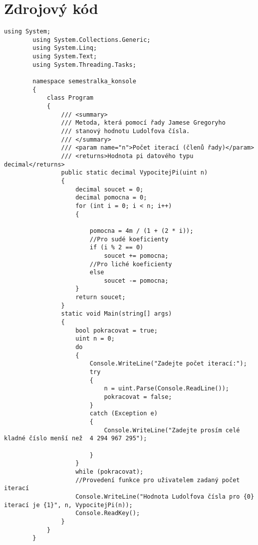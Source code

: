 \documentclass[11pt,a4paper,twoside,openright]{report}
\begin{document}
	\section{Zdrojový kód}
        \begin{lstlisting}[caption=Výsledný zdrojový kód]
        using System;
        using System.Collections.Generic;
        using System.Linq;
        using System.Text;
        using System.Threading.Tasks;
        
        namespace semestralka_konsole
        {
            class Program
            {
                /// <summary>
                /// Metoda, která pomocí řady Jamese Gregoryho
                /// stanový hodnotu Ludolfova čísla.
                /// </summary>
                /// <param name="n">Počet iterací (členů řady)</param>
                /// <returns>Hodnota pi datového typu decimal</returns>
                public static decimal VypocitejPi(uint n)
                {
                    decimal soucet = 0;
                    decimal pomocna = 0;
                    for (int i = 0; i < n; i++)
                    {
        
                        pomocna = 4m / (1 + (2 * i));
                        //Pro sudé koeficienty
                        if (i % 2 == 0)
                            soucet += pomocna;
                        //Pro liché koeficienty
                        else
                            soucet -= pomocna;
                    }
                    return soucet;
                }
                static void Main(string[] args)
                {
                    bool pokracovat = true;
                    uint n = 0;
                    do
                    {
                        Console.WriteLine("Zadejte počet iterací:");
                        try
                        {
                            n = uint.Parse(Console.ReadLine());
                            pokracovat = false;
                        }
                        catch (Exception e)
                        {
                            Console.WriteLine("Zadejte prosím celé kladné číslo menší než  4 294 967 295");
        
                        }
                    }
                    while (pokracovat);
                    //Provedení funkce pro uživatelem zadaný počet iterací
                    Console.WriteLine("Hodnota Ludolfova čísla pro {0} iterací je {1}", n, VypocitejPi(n));
                    Console.ReadKey();
                }
            }
        }
        \end{lstlisting}
\end{document}
